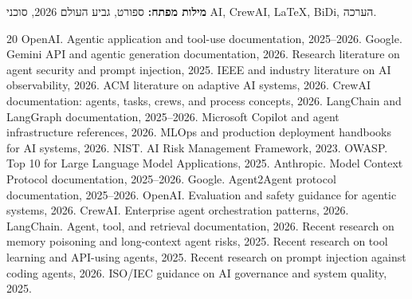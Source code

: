 \documentclass[12pt,a4paper,openany]{book}
\begin{document}
\textbf{מילות מפתח:} ספורט, גביע העולם 2026, סוכני AI, CrewAI, LaTeX, BiDi, הערכה.
\clearpage
\tableofcontents
\clearpage

\begin{thebibliography}{20}
 OpenAI. Agentic application and tool-use documentation, 2025--2026.
 Google. Gemini API and agentic generation documentation, 2026.
 Research literature on agent security and prompt injection, 2025.
 IEEE and industry literature on AI observability, 2026.
 ACM literature on adaptive AI systems, 2026.
 CrewAI documentation: agents, tasks, crews, and process concepts, 2026.
 LangChain and LangGraph documentation, 2025--2026.
 Microsoft Copilot and agent infrastructure references, 2026.
 MLOps and production deployment handbooks for AI systems, 2026.
 NIST. AI Risk Management Framework, 2023.
 OWASP. Top 10 for Large Language Model Applications, 2025.
 Anthropic. Model Context Protocol documentation, 2025--2026.
 Google. Agent2Agent protocol documentation, 2025--2026.
 OpenAI. Evaluation and safety guidance for agentic systems, 2026.
 CrewAI. Enterprise agent orchestration patterns, 2026.
 LangChain. Agent, tool, and retrieval documentation, 2026.
 Recent research on memory poisoning and long-context agent risks, 2025.
 Recent research on tool learning and API-using agents, 2025.
 Recent research on prompt injection against coding agents, 2026.
 ISO/IEC guidance on AI governance and system quality, 2025.
\end{thebibliography}
\end{document}
